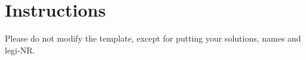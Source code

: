 \documentclass[11pt]{article}
\begin{document}

\section*{Instructions}
Please do not modify the template, except for putting your solutions, names and legi-NR.
\newpage
%                 


%             
            
            
\end{document}
